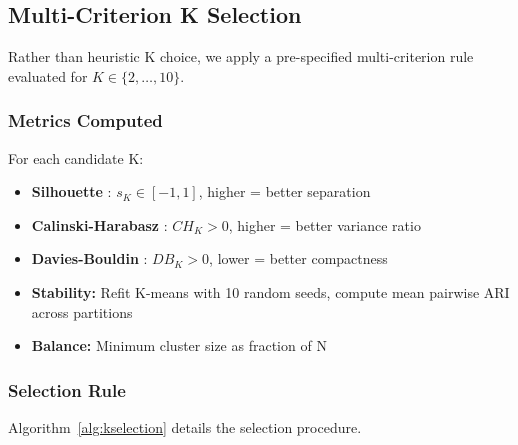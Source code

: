 \documentclass[11pt,a4paper]{article}
\begin{document}
\subsection{Multi-Criterion K Selection}
\label{sec:kselection}

Rather than heuristic K choice, we apply a pre-specified multi-criterion rule evaluated for $K \in \{2, \ldots, 10\}$.

\subsubsection{Metrics Computed}

For each candidate K:
\begin{itemize}
    \item \textbf{Silhouette} \cite{rousseeuw1987silhouettes}: $s_K \in [-1, 1]$, higher = better separation
    \item \textbf{Calinski-Harabasz} \cite{calinski1974dendrite}: $CH_K > 0$, higher = better variance ratio
    \item \textbf{Davies-Bouldin} \cite{davies1979cluster}: $DB_K > 0$, lower = better compactness
    \item \textbf{Stability:} Refit K-means with 10 random seeds, compute mean pairwise ARI across partitions
    \item \textbf{Balance:} Minimum cluster size as fraction of N
\end{itemize}

\subsubsection{Selection Rule}

Algorithm~\ref{alg:kselection} details the selection procedure.
\end{document}
